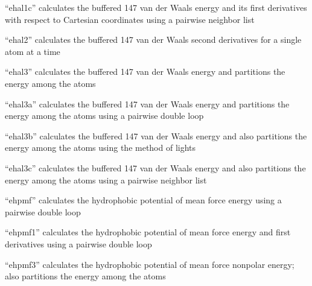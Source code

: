 \documentclass[letterpaper,11pt,english]{sphinxmanual}
\begin{document}
\sphinxAtStartPar
{}

\sphinxAtStartPar
“ehal1c” calculates the buffered 14\sphinxhyphen{}7 van der Waals energy and its first derivatives with respect to Cartesian coordinates using a pairwise neighbor list

\sphinxAtStartPar
{}

\sphinxAtStartPar
“ehal2” calculates the buffered 14\sphinxhyphen{}7 van der Waals second derivatives for a single atom at a time

\sphinxAtStartPar
{}

\sphinxAtStartPar
“ehal3” calculates the buffered 14\sphinxhyphen{}7 van der Waals energy and partitions the energy among the atoms

\sphinxAtStartPar
{}

\sphinxAtStartPar
“ehal3a” calculates the buffered 14\sphinxhyphen{}7 van der Waals energy and partitions the energy among the atoms using a pairwise double loop

\sphinxAtStartPar
{}

\sphinxAtStartPar
“ehal3b” calculates the buffered 14\sphinxhyphen{}7 van der Waals energy and also partitions the energy among the atoms using the method of lights

\sphinxAtStartPar
{}

\sphinxAtStartPar
“ehal3c” calculates the buffered 14\sphinxhyphen{}7 van der Waals energy and also partitions the energy among the atoms using a pairwise neighbor list

\sphinxAtStartPar
{}

\sphinxAtStartPar
“ehpmf” calculates the hydrophobic potential of mean force energy using a pairwise double loop

\sphinxAtStartPar
{}

\sphinxAtStartPar
“ehpmf1” calculates the hydrophobic potential of mean force energy and first derivatives using a pairwise double loop

\sphinxAtStartPar
{}

\sphinxAtStartPar
“ehpmf3” calculates the hydrophobic potential of mean force nonpolar energy; also partitions the energy among the atoms

\sphinxAtStartPar
{}
\end{document}
